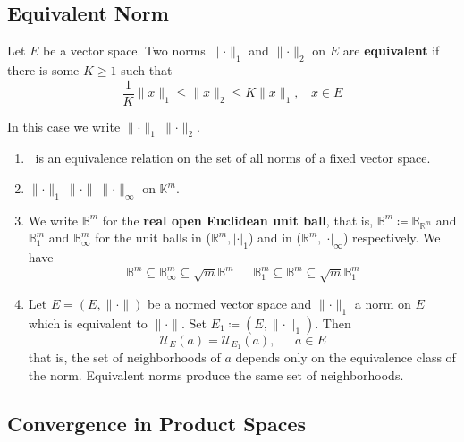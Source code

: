 \subsection*{Equivalent Norm}

Let \(E\) be a vector space. Two norms \(\lVert \cdot \rVert_1\) and \(\lVert \cdot \rVert_2\)
on \(E\) are \textbf{equivalent} if there is some \(K \geq 1\) such that 
\[
    \frac{1}{K} \lVert x \rVert_1 \leq \lVert x \rVert_2 \leq K \lVert x \rVert_1 , \:\:\:\: x\in E
\]

In this case we write \(\lVert \cdot \rVert_1 ~ \lVert \cdot \rVert_2\). 

\begin{remark}
    \begin{enumerate}[label=(\alph*)]
        \item \(~\) is an equivalence relation on the set of all norms of a fixed vector space. 
        \item \(\lVert \cdot \rVert_1 ~ \lVert \cdot \rVert ~ \lVert \cdot \rVert_\infty\) 
        on \(\mathbb{K}^m\). 
        \item We write \(\mathbb{B}^m\) for the \textbf{real open Euclidean unit ball},
        that is, \(\mathbb{B}^m \coloneqq \mathbb{B}_{\mathbb{R}^m}\) and 
        \(\mathbb{B}^m_1\) and \(\mathbb{B}^m_\infty\) for the unit balls in 
        (\(\mathbb{R}^m, \lvert \cdot \rvert_1\)) and in (\(\mathbb{R}^m, \lvert \cdot \rvert_\infty\))
        respectively. We have
        \[
          \mathbb{B}^m \subseteq \mathbb{B}^m_\infty \subseteq \sqrt{m}\mathbb{B}^m
          \:\:\:\:\:\:\:
          \mathbb{B}^m_1 \subseteq \mathbb{B}^m \subseteq \sqrt{m}\mathbb{B}^m_1
        \]

        \item Let \(E = \left(E, \lVert \cdot \rVert \right)\) be a normed vector space
        and \(\lVert \cdot \rVert_1\) a norm on \(E\) which is equivalent to
        \(\lVert \cdot \rVert\). Set \(E_1 \coloneqq \left(E, \lVert \cdot \rVert_1\right)\). 
        Then 
        \[
            \mathcal{U}_E(a) = \mathcal{U}_{E_1}(a), \:\:\:\:\:\:\: a \in E  
        \]
        that is, the set of neighborhoods of \(a\) depends only on the equivalence class
        of the norm. Equivalent norms produce the same set of neighborhoods. 
    \end{enumerate}
\end{remark}

\subsection*{Convergence in Product Spaces}

